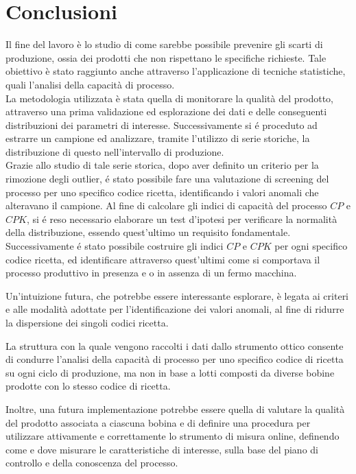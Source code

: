 \chapter*{Conclusioni}
\label{chap:Conclusioni}



Il fine del lavoro è lo studio di come sarebbe possibile prevenire gli scarti di produzione, ossia dei prodotti che non rispettano le specifiche richieste. 
Tale obiettivo è stato raggiunto anche attraverso l'applicazione di tecniche statistiche, quali l'analisi della capacità di processo. \\
La metodologia utilizzata è stata quella di monitorare la qualità del prodotto, attraverso una prima validazione ed esplorazione dei dati e delle conseguenti distribuzioni dei parametri di interesse.
Successivamente si é proceduto ad estrarre un campione ed analizzare, tramite l'utilizzo di serie storiche, la distribuzione di questo nell'intervallo di produzione. \\
Grazie allo studio di tale serie storica, dopo aver definito un criterio per la rimozione degli outlier, é stato possibile fare una valutazione di screening del processo per uno specifico codice ricetta, identificando i valori anomali che alteravano il campione.
Al fine di calcolare gli indici di capacità del processo $CP$ e $CPK$, si é reso necessario elaborare un test d'ipotesi per verificare la normalità della distribuzione, essendo quest'ultimo un requisito fondamentale. \\
Successivamente é stato possibile costruire gli indici $CP$ e $CPK$ per ogni specifico codice ricetta, ed identificare attraverso quest'ultimi come si comportava il processo produttivo in presenza e o in assenza di un fermo macchina.

Un'intuizione futura, che potrebbe essere interessante esplorare, è legata ai criteri e alle modalità adottate per l'identificazione dei valori anomali, al fine di ridurre la dispersione dei singoli codici ricetta.

La struttura con la quale vengono raccolti i dati dallo strumento ottico consente di condurre l'analisi della capacità di processo per uno specifico codice di ricetta su ogni ciclo di produzione, ma non in base a lotti composti da diverse bobine prodotte con lo stesso codice di ricetta.

Inoltre, una futura implementazione potrebbe essere quella di valutare la qualità del prodotto associata a ciascuna bobina e di definire una procedura per utilizzare attivamente e correttamente lo strumento di misura online, definendo come e dove misurare le caratteristiche di interesse, sulla base del piano di controllo e della conoscenza del processo.

